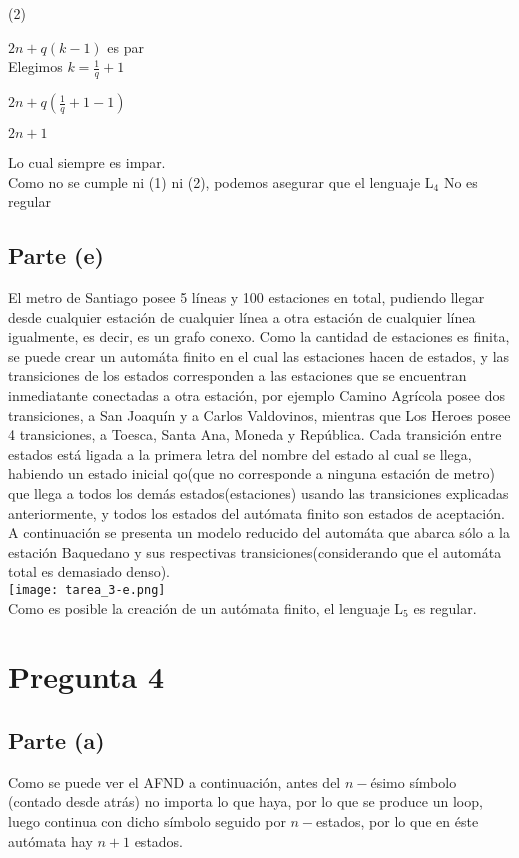 \documentclass[11pt,letterpaper]{article}
\begin{document}
(2) 

$2n+q(k-1)$ es par
 \\
 
Elegimos $k = \frac{1}{q} + 1$

$2n+q(\frac{1}{q} + 1 -1)$

$2n+1$

Lo cual siempre es impar.
 \\

Como no se cumple ni (1) ni (2), podemos asegurar que el lenguaje L$_{4}$ No es regular


\subsection{Parte (e)}
El metro de Santiago posee 5 líneas y 100 estaciones en total, pudiendo llegar desde cualquier estación de cualquier línea a otra estación de cualquier línea igualmente, es decir, es un grafo conexo. Como la cantidad de estaciones es finita, se puede crear un automáta finito en el cual las estaciones hacen de estados, y las transiciones de los estados corresponden a las estaciones que se encuentran inmediatante conectadas a otra estación, por ejemplo Camino Agrícola posee dos transiciones, a San Joaquín y a Carlos Valdovinos, mientras que Los Heroes posee 4 transiciones, a Toesca, Santa Ana, Moneda y República. Cada transición entre estados está ligada a la primera letra del nombre del estado al cual se llega, habiendo un estado inicial qo(que no corresponde a ninguna estación de metro) que llega a todos los demás estados(estaciones) usando las transiciones explicadas anteriormente, y todos los estados del autómata finito son estados de aceptación. A continuación se presenta un modelo reducido del automáta que abarca sólo a la estación Baquedano y sus respectivas transiciones(considerando que el automáta total es demasiado denso).
 \\
\texttt{[image: tarea\_3-e.png]}
 \\
Como es posible la creación de un autómata finito, el lenguaje L$_{5}$ es regular.


\section{Pregunta 4}
\subsection{Parte (a)}
Como se puede ver el AFND a continuación, antes del $n-$ésimo símbolo (contado desde atrás) no importa lo que haya, por lo que se produce un loop, luego continua con dicho símbolo seguido por $n-$estados, por lo que en éste autómata hay $n+1$ estados.
\end{document}
